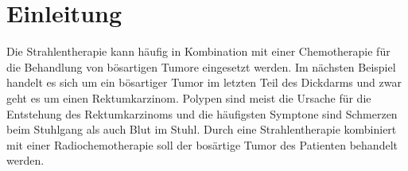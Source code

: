 \section{Einleitung}
\label{sec:Einleitung}
Die Strahlentherapie kann häufig in Kombination mit einer Chemotherapie für die Behandlung von bösartigen Tumore eingesetzt werden.
Im nächsten Beispiel handelt es sich um ein bösartiger Tumor im letzten Teil des Dickdarms und zwar geht es um einen Rektumkarzinom. Polypen sind meist die Ursache für die Entstehung des Rektumkarzinoms und die häufigsten Symptone sind Schmerzen beim Stuhlgang als auch Blut im Stuhl. \cite{Rektum}
Durch eine Strahlentherapie kombiniert mit einer Radiochemotherapie soll der bosärtige Tumor des Patienten behandelt werden.
